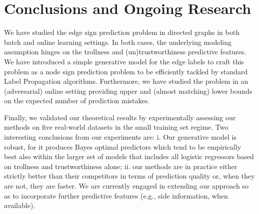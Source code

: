 
\section{Conclusions and Ongoing Research}
%
We have studied the edge sign prediction problem in directed graphs in both batch and online learning settings. In both cases, the underlying modeling assumption hinges on the trollness and (un)trustworthiness predictive features. We have introduced a simple generative model for the edge labels 
to craft this problem as a node sign prediction problem to be efficiently tackled by standard Label Propagation algorithms. 
Furthermore, we have studied the problem in an (adversarial) online setting providing 
upper and (almost matching) lower bounds on the expected number of prediction mistakes.


Finally, we validated our theoretical results by experimentally assessing our methods on five real-world datasets in the small training set regime. 
Two interesting conclusions from our experiments are: i. Our generative model is robust, for it produces Bayes optimal predictors which tend to be empirically best also within the larger set of models that includes all logistic regressors based on trollness and trustworthiness alone; ii. 
our methods are in practice either strictly better than their competitors in terms of prediction quality or, when they are not, they are faster.
We are currently engaged in 
extending our approach so as to incorporate further predictive features (e.g., side information, when available).
